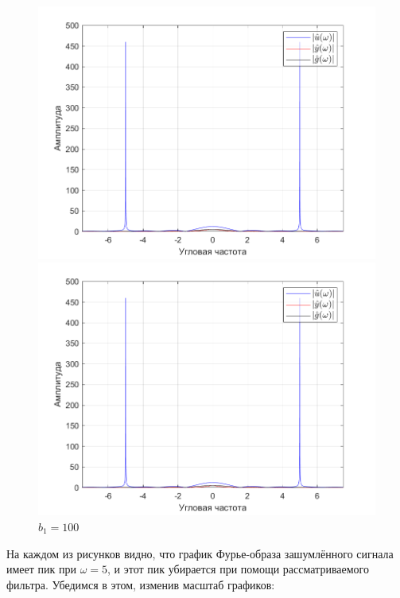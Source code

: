 \documentclass[a4paper]{article}
\begin{document}
\begin{figure}[H]
    \begin{minipage}{0.5\textwidth}
        \centering
        \includegraphics[width=\linewidth]{ex1_2/a1=0_a2=25_b1=50_b2=25_d=5/h4.png}
        \caption{$b_1=50$}
    \end{minipage}
    \begin{minipage}{0.5\textwidth}
        \centering
        \includegraphics[width=\linewidth]{ex1_2/a1=0_a2=25_b1=100_b2=25_d=5/h4.png}
        \caption{$b_1=100$}
    \end{minipage}
\end{figure}

На каждом из рисунков видно, что график Фурье-образа зашумлённого сигнала имеет пик при $\omega = 5$, и этот пик убирается при помощи рассматриваемого фильтра. Убедимся в этом, изменив масштаб графиков:
\end{document}
